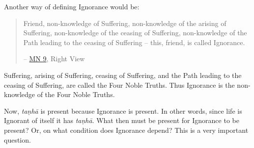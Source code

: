 Another way of defining Ignorance would be:

\begin{quote}
Friend, non-knowledge of Suffering, non-knowledge of the arising of Suffering, non-knowledge of the ceasing of Suffering, non-knowledge of the Path leading to the ceasing of Suffering -- this, friend, is called Ignorance.

 -- \href{https://suttacentral.net/mn9/en/bodhi}{MN 9}, Right View
\end{quote}

Suffering, arising of Suffering, ceasing of Suffering, and the Path leading to the ceasing of Suffering, are called the Four Noble Truths. Thus Ignorance is the non-knowledge of the Four Noble Truths.

Now, \textit{taṇhā} is present because Ignorance is present. In other words, since life is Ignorant of itself it has \textit{taṇhā}. What then must be present for Ignorance to be present? Or, on what condition does Ignorance depend? This is a very important question.

